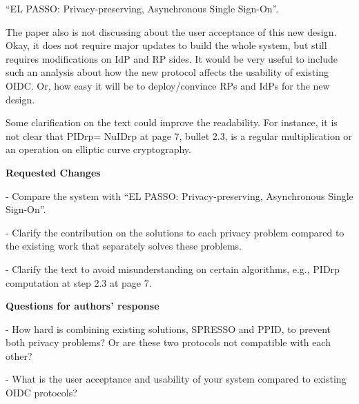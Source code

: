 \documentclass[letterpaper,onecolumn,10pt]{article}
\begin{document}
“EL PASSO: Privacy-preserving, Asynchronous Single Sign-On”.

The paper also is not discussing about the user acceptance of this new design. Okay, it does not require major updates to build the whole system, but still requires modifications on IdP and RP sides. It would be very useful to include such an analysis about how the new protocol affects the usability of existing OIDC. Or, how easy it will be to deploy/convince RPs and IdPs for the new design.

Some clarification on the text could improve the readability. For instance, it is not clear that PIDrp= NuIDrp at page 7, bullet 2.3, is a regular multiplication or an operation on elliptic curve cryptography.

\vspace{1mm}\noindent\textbf{Requested Changes}


-	Compare the system with “EL PASSO: Privacy-preserving, Asynchronous Single Sign-On”.

-	Clarify the contribution on the solutions to each privacy problem compared to the existing work that separately solves these problems.

-	Clarify the text to avoid misunderstanding on certain algorithms, e.g., PIDrp computation at step 2.3 at page 7.

\vspace{1mm}\noindent\textbf{Questions for authors' response}


-	How hard is combining existing solutions, SPRESSO and PPID, to prevent both privacy problems? Or are these two protocols not compatible with each other?

-	What is the user acceptance and usability of your system compared to existing OIDC protocols?
\end{document}

